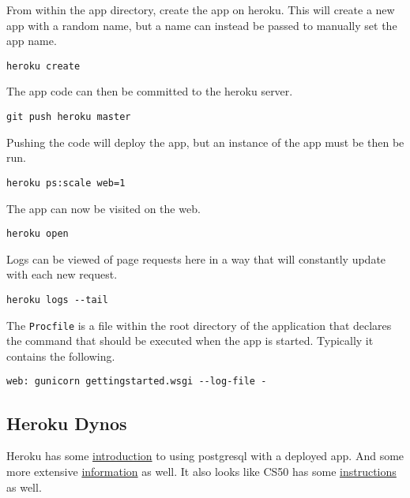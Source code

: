\documentclass[]{book}
\begin{document}
From within the app directory, create the app on heroku. This will create a new app with a random name, but a name can instead be passed to manually set the app name.

\begin{verbatim}
heroku create
\end{verbatim}

The app code can then be committed to the heroku server.

\begin{verbatim}
git push heroku master
\end{verbatim}

Pushing the code will deploy the app, but an instance of the app must be then be run.

\begin{verbatim}
heroku ps:scale web=1
\end{verbatim}

The app can now be visited on the web.

\begin{verbatim}
heroku open
\end{verbatim}

Logs can be viewed of page requests here in a way that will constantly update with each new request.

\begin{verbatim}
heroku logs --tail
\end{verbatim}

The \texttt{Procfile} is a file within the root directory of the application that declares the command that should be executed when the app is started. Typically it contains the following.

\begin{verbatim}
web: gunicorn gettingstarted.wsgi --log-file -
\end{verbatim}

\hypertarget{heroku-dynos}{%
\subsection{Heroku Dynos}\label{heroku-dynos}}

Heroku has some \href{'https://devcenter.heroku.com/articles/getting-started-with-python\#provision-a-database'}{introduction} to using postgresql with a deployed app. And some more extensive \href{'https://devcenter.heroku.com/articles/heroku-postgresql'}{information} as well. It also looks like CS50 has some \href{'https://cs50.readthedocs.io/heroku/'}{instructions} as well.
\end{document}
